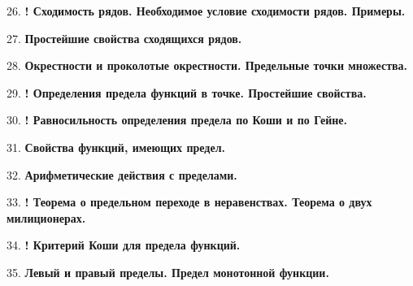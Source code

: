 \documentclass[12pt]{article}
\begin{document}
26. \textbf{! Сходимость рядов. Необходимое условие сходимости рядов. Примеры.}

27. \textbf{Простейшие свойства сходящихся рядов.}

28. \textbf{Окрестности и проколотые окрестности. Предельные точки множества.}

29. \textbf{! Определения предела функций в точке. Простейшие свойства.}

30. \textbf{! Равносильность определения предела по Коши и по Гейне.}

31. \textbf{Свойства функций, имеющих предел.}

32. \textbf{Арифметические действия с пределами.}

33. \textbf{! Теорема о предельном переходе в неравенствах. Теорема о двух милиционерах.}

34. \textbf{! Критерий Коши для предела функций.}

35. \textbf{Левый и правый пределы. Предел монотонной функции.}
\end{document}
